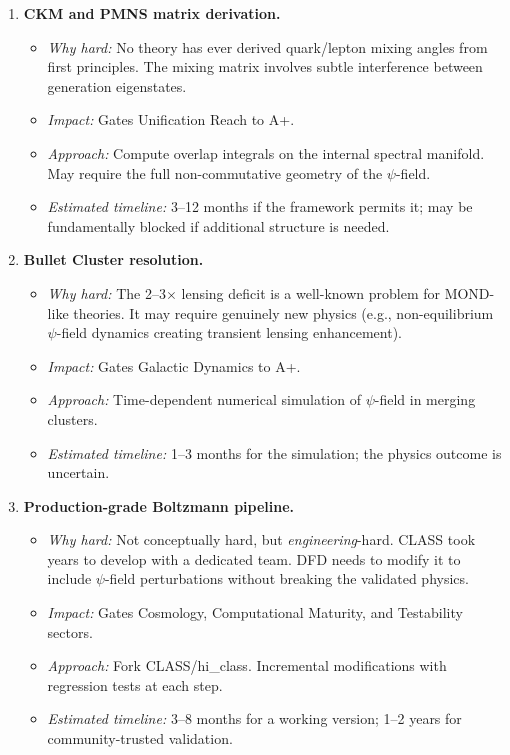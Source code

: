 \documentclass[11pt,a4paper]{article}
\begin{document}
\begin{enumerate}
    \item \textcolor{hardproblem}{\textbf{CKM and PMNS matrix derivation.}}
    \begin{itemize}
        \item \emph{Why hard:} No theory has ever derived quark/lepton mixing angles from first principles. The mixing matrix involves subtle interference between generation eigenstates.
        \item \emph{Impact:} Gates Unification Reach to A+.
        \item \emph{Approach:} Compute overlap integrals on the internal spectral manifold. May require the full non-commutative geometry of the $\psi$-field.
        \item \emph{Estimated timeline:} 3--12 months if the framework permits it; may be fundamentally blocked if additional structure is needed.
    \end{itemize}

    \item \textcolor{hardproblem}{\textbf{Bullet Cluster resolution.}}
    \begin{itemize}
        \item \emph{Why hard:} The 2--3$\times$ lensing deficit is a well-known problem for MOND-like theories. It may require genuinely new physics (e.g., non-equilibrium $\psi$-field dynamics creating transient lensing enhancement).
        \item \emph{Impact:} Gates Galactic Dynamics to A+.
        \item \emph{Approach:} Time-dependent numerical simulation of $\psi$-field in merging clusters.
        \item \emph{Estimated timeline:} 1--3 months for the simulation; the physics outcome is uncertain.
    \end{itemize}

    \item \textcolor{hardproblem}{\textbf{Production-grade Boltzmann pipeline.}}
    \begin{itemize}
        \item \emph{Why hard:} Not conceptually hard, but \emph{engineering}-hard. CLASS took years to develop with a dedicated team. DFD needs to modify it to include $\psi$-field perturbations without breaking the validated physics.
        \item \emph{Impact:} Gates Cosmology, Computational Maturity, and Testability sectors.
        \item \emph{Approach:} Fork CLASS/hi\_class. Incremental modifications with regression tests at each step.
        \item \emph{Estimated timeline:} 3--8 months for a working version; 1--2 years for community-trusted validation.
    \end{itemize}


\end{enumerate}
\end{document}
